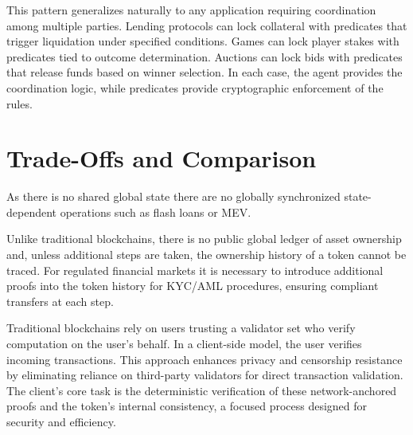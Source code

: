 \documentclass{article}
\begin{document}
This pattern generalizes naturally to any application requiring coordination among multiple parties. Lending protocols can lock collateral with predicates that trigger liquidation under specified conditions. Games can lock player stakes with predicates tied to outcome determination. Auctions can lock bids with predicates that release funds based on winner selection. In each case, the agent provides the coordination logic, while predicates provide cryptographic enforcement of the rules.

\section{Trade-Offs and Comparison}

As there is no shared global state there are no globally synchronized state-dependent operations such as flash loans or MEV.

Unlike traditional blockchains, there is no public global ledger of asset ownership and, unless additional steps are taken, the ownership history of a token cannot be traced.  For regulated financial markets it is necessary to introduce additional proofs into the token history for KYC/AML procedures, ensuring compliant transfers at each step.

Traditional blockchains rely on users trusting a validator set who verify computation on the user's behalf. In a client-side model, the user verifies incoming transactions. This approach enhances privacy and censorship resistance by eliminating reliance on third-party validators for direct transaction validation. The client's core task is the deterministic verification of these network-anchored proofs and the token's internal consistency, a focused process designed for security and efficiency.
\end{document}
